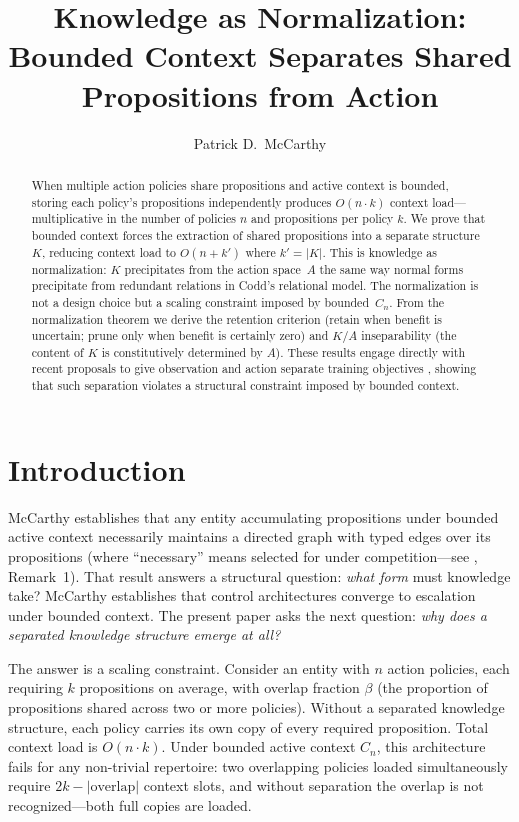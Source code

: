 \documentclass[11pt]{article}
\title{Knowledge as Normalization:\\Bounded Context Separates Shared\\Propositions from Action}
\author{Patrick D.\ McCarthy}
\date{}
\theoremstyle{definition}
\theoremstyle{remark}
\begin{document}
\maketitle

\begin{abstract}
When multiple action policies share propositions and active context is
bounded, storing each policy's propositions independently produces
$O(n \cdot k)$ context load---multiplicative in the number of policies
$n$ and propositions per policy $k$. We prove that bounded context
forces the extraction of shared propositions into a separate
structure~$K$, reducing context load to $O(n + k')$ where $k' = |K|$.
This is knowledge as normalization: $K$ precipitates from the action
space~$A$ the same way normal forms precipitate from redundant
relations in Codd's relational model. The normalization is not a
design choice but a scaling constraint imposed by bounded~$C_n$.
From the normalization theorem we derive the retention criterion
(retain when benefit is uncertain; prune only when benefit is
certainly zero) and $K/A$ inseparability (the content of $K$ is
constitutively determined by $A$). These results engage directly
with recent proposals to give observation and action separate
training objectives \cite{DupouxLeCunMalik2026}, showing that such
separation violates a structural constraint imposed by bounded context.
\end{abstract}

\section{Introduction}
\label{sec:intro}

McCarthy \cite{McCarthy2026a} establishes that any entity accumulating
propositions under bounded active context necessarily maintains a
directed graph with typed edges over its propositions (where
``necessary'' means selected for under competition---see
\cite{McCarthy2026a}, Remark~1). That result
answers a structural question: \emph{what form} must knowledge take?
McCarthy \cite{McCarthy2026b} establishes that control architectures
converge to escalation under bounded context. The present paper asks the
next question: \emph{why does a separated knowledge structure emerge at
all?}

The answer is a scaling constraint. Consider an entity with $n$ action
policies, each requiring $k$ propositions on average, with overlap
fraction $\beta$ (the proportion of propositions shared across two or
more policies). Without a separated knowledge structure, each policy
carries its own copy of every required proposition. Total context load
is $O(n \cdot k)$. Under bounded active context $C_n$, this
architecture fails for any non-trivial repertoire: two overlapping
policies loaded simultaneously require $2k - |\text{overlap}|$ context
slots, and without separation the overlap is not recognized---both full
copies are loaded.
\end{document}
